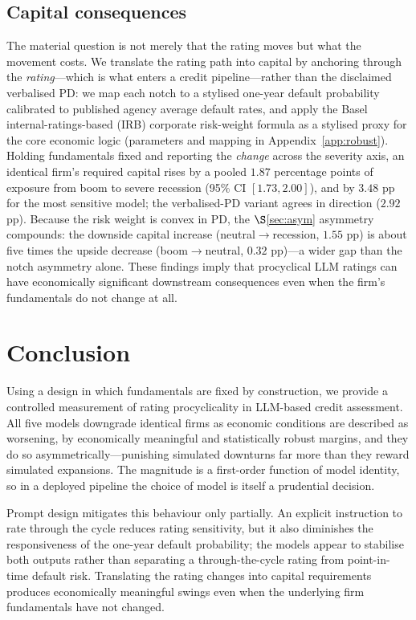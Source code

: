 \documentclass[a4paper,fleqn]{cas-sc}
\begin{document}
\subsection{Capital consequences}\label{sec:capital}
The material question is not merely that the rating moves but what the movement costs. We translate
the rating path into capital by anchoring through the \emph{rating}---which is what enters a credit
pipeline---rather than the disclaimed verbalised PD: we map each notch to a stylised one-year default
probability calibrated to published agency average default rates, and apply the Basel
internal-ratings-based (IRB) corporate risk-weight formula as a stylised proxy for the core economic
logic (parameters and mapping in Appendix~\ref{app:robust}). Holding fundamentals
fixed and reporting the \emph{change} across the severity axis, an identical firm's required capital
rises by a pooled $1.87$ percentage points of exposure from boom to severe recession (95\% CI
$[1.73,2.00]$), and by $3.48$ pp for the most sensitive model; the verbalised-PD variant agrees in
direction ($2.92$ pp). Because the risk weight is convex in PD, the $\S$\ref{sec:asym} asymmetry
compounds: the downside capital increase (neutral$\to$recession, $1.55$ pp) is about five times the
upside decrease (boom$\to$neutral, $0.32$ pp)---a wider gap than the notch asymmetry alone. These
findings imply that procyclical LLM ratings can have economically significant downstream consequences
even when the firm's fundamentals do not change at all.

\section{Conclusion}\label{sec:concl}
Using a design in which fundamentals are fixed by construction, we provide a controlled measurement of
rating procyclicality in LLM-based credit assessment. All five models downgrade identical firms as
economic conditions are described as worsening, by economically meaningful and statistically robust
margins, and they do so asymmetrically---punishing simulated downturns far more than they reward
simulated expansions. The magnitude is a first-order function of model identity, so in a deployed
pipeline the choice of model is itself a prudential decision.

Prompt design mitigates this behaviour only partially. An explicit instruction to rate through the
cycle reduces rating sensitivity, but it also diminishes the responsiveness of the one-year default
probability; the models appear to stabilise both outputs rather than separating a through-the-cycle
rating from point-in-time default risk. Translating the rating changes into capital requirements
produces economically meaningful swings even when the underlying firm fundamentals have not changed.
\end{document}
